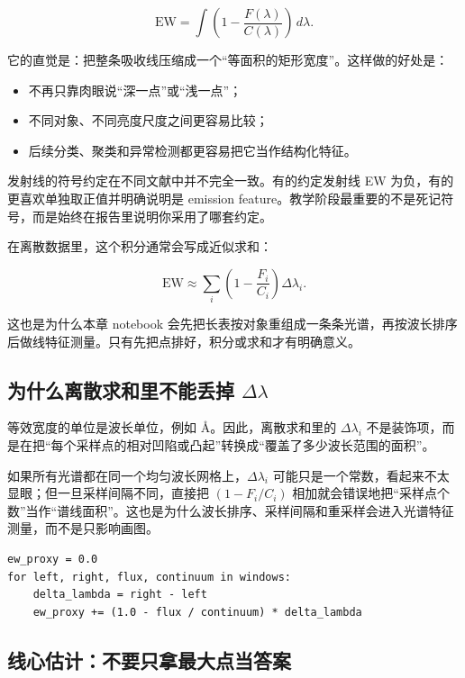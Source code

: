 \[
\mathrm{EW} = \int \left(1 - \frac{F(\lambda)}{C(\lambda)}\right)\, d\lambda.
\]

它的直觉是：把整条吸收线压缩成一个“等面积的矩形宽度”。这样做的好处是：

\begin{itemize}
    \item 不再只靠肉眼说“深一点”或“浅一点”；
    \item 不同对象、不同亮度尺度之间更容易比较；
    \item 后续分类、聚类和异常检测都更容易把它当作结构化特征。
\end{itemize}

发射线的符号约定在不同文献中并不完全一致。有的约定发射线 EW 为负，有的更喜欢单独取正值并明确说明是 emission feature。教学阶段最重要的不是死记符号，而是始终在报告里说明你采用了哪套约定。

在离散数据里，这个积分通常会写成近似求和：

\[
\mathrm{EW} \approx \sum_i \left(1 - \frac{F_i}{C_i}\right)\Delta \lambda_i.
\]

这也是为什么本章 notebook 会先把长表按对象重组成一条条光谱，再按波长排序后做线特征测量。只有先把点排好，积分或求和才有明确意义。

\subsection{为什么离散求和里不能丢掉 \texorpdfstring{$\Delta\lambda$}{Delta lambda}}

等效宽度的单位是波长单位，例如 \(\text{\AA}\)。因此，离散求和里的 \(\Delta\lambda_i\) 不是装饰项，而是在把“每个采样点的相对凹陷或凸起”转换成“覆盖了多少波长范围的面积”。

如果所有光谱都在同一个均匀波长网格上，\(\Delta\lambda_i\) 可能只是一个常数，看起来不太显眼；但一旦采样间隔不同，直接把 \((1-F_i/C_i)\) 相加就会错误地把“采样点个数”当作“谱线面积”。这也是为什么波长排序、采样间隔和重采样会进入光谱特征测量，而不是只影响画图。

\begin{examplebox}[离散等效宽度近似]
\begin{lstlisting}[style=pythonstyle]
ew_proxy = 0.0
for left, right, flux, continuum in windows:
    delta_lambda = right - left
    ew_proxy += (1.0 - flux / continuum) * delta_lambda
\end{lstlisting}
\end{examplebox}

\subsection{线心估计：不要只拿最大点当答案}

